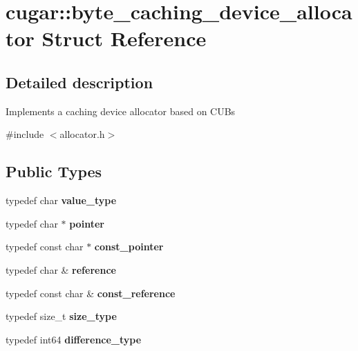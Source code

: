 \hypertarget{structcugar_1_1byte__caching__device__allocator}{}\section{cugar\+:\+:byte\+\_\+caching\+\_\+device\+\_\+allocator Struct Reference}
\label{structcugar_1_1byte__caching__device__allocator}


\subsection{Detailed description}
Implements a caching device allocator based on C\+UB\textquotesingle{}s 

{\ttfamily \#include $<$allocator.\+h$>$}

\subsection*{Public Types}
\begin{DoxyCompactItemize}
\item 
\mbox{\label{structcugar_1_1byte__caching__device__allocator_ac6ae65c9ca6bf948fdb247638bdeb3e3}} 
typedef char {\bfseries value\+\_\+type}
\item 
\mbox{\label{structcugar_1_1byte__caching__device__allocator_a30f1dc8ae6ba139a880309cc455d193f}} 
typedef char $\ast$ {\bfseries pointer}
\item 
\mbox{\label{structcugar_1_1byte__caching__device__allocator_ac282243dad2b6f1d14c749ef6e84c55a}} 
typedef const char $\ast$ {\bfseries const\+\_\+pointer}
\item 
\mbox{\label{structcugar_1_1byte__caching__device__allocator_aa0251e96fadf86087978cb858fb7ac38}} 
typedef char \& {\bfseries reference}
\item 
\mbox{\label{structcugar_1_1byte__caching__device__allocator_aed8279ffe4f81c0a85618462029c8945}} 
typedef const char \& {\bfseries const\+\_\+reference}
\item 
\mbox{\label{structcugar_1_1byte__caching__device__allocator_a12e20445552de344a632da9d6d4db288}} 
typedef size\+\_\+t {\bfseries size\+\_\+type}
\item 
\mbox{\label{structcugar_1_1byte__caching__device__allocator_a175505dd27404427e03448294ea5778a}} 
typedef int64 {\bfseries difference\+\_\+type}
\end{DoxyCompactItemize}

